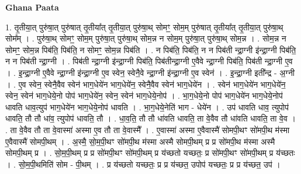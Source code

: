 \documentclass[17pt]{extarticle}
\begin{document}
\textbf{Ghana Paata } \newline

1. तृ॒तीया॒त् पुरु॑षा॒त् पुरु॑षात् तृ॒तीया᳚त् तृ॒तीया॒त् पुरु॑षा॒थ् सोमꣳ॒॒ सोम॒म् पुरु॑षात् तृ॒तीया᳚त् तृ॒तीया॒त् पुरु॑षा॒थ् सोम᳚म् । . पुरु॑षा॒थ् सोमꣳ॒॒ सोम॒म् पुरु॑षा॒त् पुरु॑षा॒थ् सोम॒न्न न सोम॒म् पुरु॑षा॒त् पुरु॑षा॒थ् सोम॒न्न । . सोम॒न्न न सोमꣳ॒॒ सोम॒न्न पिब॑ति॒ पिब॑ति॒ न सोमꣳ॒॒ सोम॒न्न पिब॑ति । . न पिब॑ति॒ पिब॑ति॒ न न पिब॑ती न्द्रा॒ग्नी इ॑न्द्रा॒ग्नी पिब॑ति॒ न न पिब॑ती न्द्रा॒ग्नी । . पिब॑ती न्द्रा॒ग्नी इ॑न्द्रा॒ग्नी पिब॑ति॒ पिब॑तीन्द्रा॒ग्नी ए॒वैवे न्द्रा॒ग्नी पिब॑ति॒ पिब॑ती न्द्रा॒ग्नी ए॒व । . इ॒न्द्रा॒ग्नी ए॒वैवे न्द्रा॒ग्नी इ॑न्द्रा॒ग्नी ए॒व स्वेन॒ स्वेनै॒वे न्द्रा॒ग्नी इ॑न्द्रा॒ग्नी ए॒व स्वेन॑ । . इ॒न्द्रा॒ग्नी इती᳚न्द्र - अ॒ग्नी । . ए॒व स्वेन॒ स्वेनै॒वैव स्वेन॑ भाग॒धेये॑न भाग॒धेये॑न॒ स्वेनै॒वैव स्वेन॑ भाग॒धेये॑न । . स्वेन॑ भाग॒धेये॑न भाग॒धेये॑न॒ स्वेन॒ स्वेन॑ भाग॒धेये॒नो पोप॑ भाग॒धेये॑न॒ स्वेन॒ स्वेन॑ भाग॒धेये॒नोप॑ । . भा॒ग॒धेये॒नो पोप॑ भाग॒धेये॑न भाग॒धेये॒नोप॑ धावति धाव॒त्युप॑ भाग॒धेये॑न भाग॒धेये॒नोप॑ धावति । . भा॒ग॒धेये॒नेति॑ भाग - धेये॑न । . उप॑ धावति धाव॒ त्युपोप॑ धावति॒ तौ तौ धा॑व॒ त्युपोप॑ धावति॒ तौ । . धा॒व॒ति॒ तौ तौ धा॑वति धावति॒ ता वे॒वैव तौ धा॑वति धावति॒ ता वे॒व । . ता वे॒वैव तौ ता वे॒वास्मा॑ अस्मा ए॒व तौ ता वे॒वास्मै᳚ । . ए॒वास्मा॑ अस्मा ए॒वैवास्मै॑ सोमपी॒थꣳ सो॑मपी॒थ म॑स्मा ए॒वैवास्मै॑ सोमपी॒थम् । . अ॒स्मै॒ सो॒म॒पी॒थꣳ सो॑मपी॒थ म॑स्मा अस्मै सोमपी॒थम् प्र प्र सो॑मपी॒थ म॑स्मा अस्मै सोमपी॒थम् प्र । . सो॒म॒पी॒थम् प्र प्र सो॑मपी॒थꣳ सो॑मपी॒थम् प्र य॑च्छतो यच्छतः॒ प्र सो॑मपी॒थꣳ सो॑मपी॒थम् प्र य॑च्छतः । . सो॒म॒पी॒थमिति॑ सोम - पी॒थम् । . प्र य॑च्छतो यच्छतः॒ प्र प्र य॑च्छत॒ उपोप॑ यच्छतः॒ प्र प्र य॑च्छत॒ उप॑ । \newline
\end{document}
